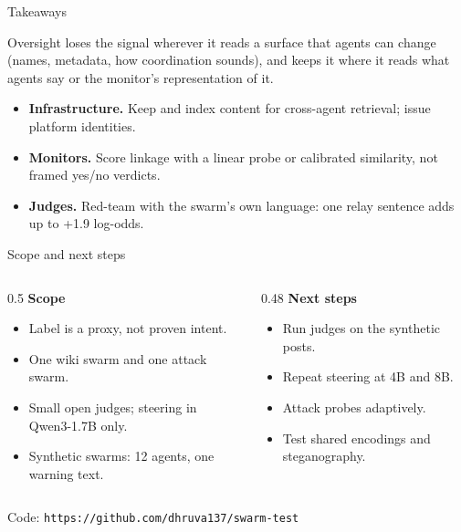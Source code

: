 \documentclass[aspectratio=169,11pt]{beamer}
\begin{document}
\begin{frame}{Takeaways}
\small
{\normalsize Oversight loses the signal wherever it reads a surface that agents can change (names, metadata, how coordination sounds), and keeps it where it reads what agents say or the monitor's representation of it.\par}
\vspace{0.8em}
\begin{itemize}\setlength{\itemsep}{0.45em}
\item \textbf{Infrastructure.} Keep and index content for cross-agent retrieval; issue platform identities.
\item \textbf{Monitors.} Score linkage with a linear probe or calibrated similarity, not framed yes/no verdicts.
\item \textbf{Judges.} Red-team with the swarm's own language: one relay sentence adds up to +1.9 log-odds.
\end{itemize}
\end{frame}

\begin{frame}{Scope and next steps}
\small
\begin{columns}[T]
\begin{column}{0.5\textwidth}
\textbf{Scope}
\begin{itemize}\setlength{\itemsep}{0.4em}
\item Label is a proxy, not proven intent.
\item One wiki swarm and one attack swarm.
\item Small open judges; steering in Qwen3-1.7B only.
\item Synthetic swarms: 12 agents, one warning text.
\end{itemize}
\end{column}
\begin{column}{0.48\textwidth}
\textbf{Next steps}
\begin{itemize}\setlength{\itemsep}{0.4em}
\item Run judges on the synthetic posts.
\item Repeat steering at 4B and 8B.
\item Attack probes adaptively.
\item Test shared encodings and steganography.
\end{itemize}
\end{column}
\end{columns}
\vfill
\noindent Code: {\color{accent}\texttt{https://github.com/dhruva137/swarm-test}}
\end{frame}
\end{document}

